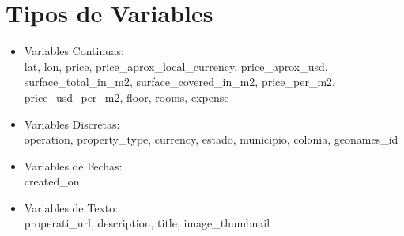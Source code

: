 \documentclass{report}
\begin{document}
    \section{Tipos de Variables}
    \begin{itemize}
        \item Variables Continuas:\\
        lat, lon, price, price\_aprox\_local\_currency, price\_aprox\_usd, surface\_total\_in\_m2, surface\_covered\_in\_m2, price\_per\_m2, price\_usd\_per\_m2, floor, rooms, expense
        \item Variables Discretas:\\
        operation, property\_type, currency, estado, municipio, colonia, geonames\_id
        \item Variables de Fechas:\\
        created\_on
        \item Variables de Texto:\\
        properati\_url, description, title, image\_thumbnail
    \end{itemize} 
    
\end{document}
